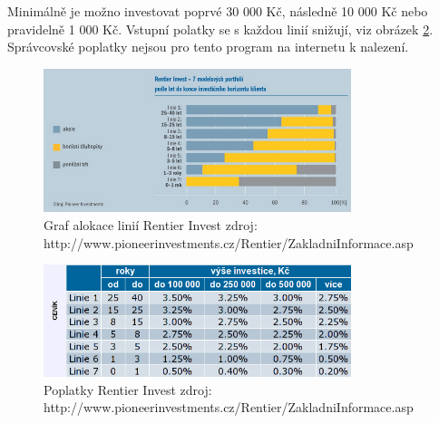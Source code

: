 \documentclass[a4paper,12pt]{article}
\begin{document}
		Minimálně je možno investovat poprvé 30 000 Kč, následně 10 000 Kč nebo pravidelně 1 000 Kč. Vstupní polatky se s každou linií snižují, viz obrázek \ref{ri_cost}. Správcovské poplatky nejsou pro tento program na internetu k nalezení.
		\begin{figure}[h!]
		  	\centering
			\includegraphics[width=0.8\textwidth]{graf_alokace_linii.png}			
			\caption{Graf alokace linií Rentier Invest zdroj: http://www.pioneerinvestments.cz/Rentier/ZakladniInformace.asp}
			\label{ri_linie}
		\end{figure}
		\begin{figure}[h!]
		  	\centering
			\includegraphics[width=0.8\textwidth]{ri_cost.png}			
			\caption{Poplatky Rentier Invest zdroj: http://www.pioneerinvestments.cz/Rentier/ZakladniInformace.asp}
			\label{ri_cost}
		\end{figure}
\clearpage
\appendix
\end{document}
